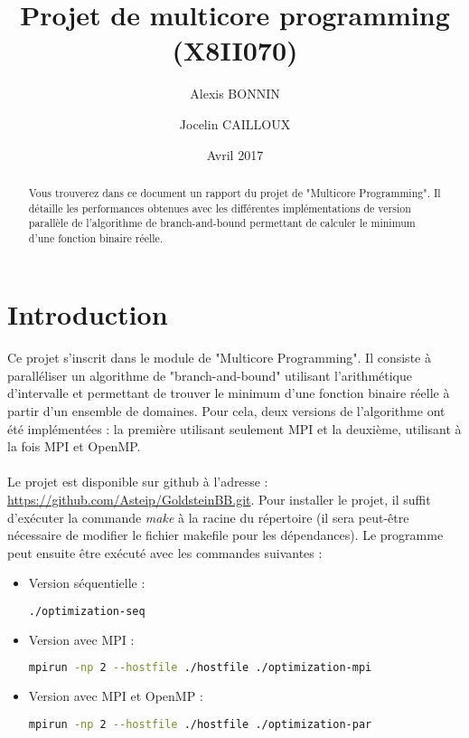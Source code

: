 \documentclass[11pt]{article}
\title{Projet de multicore programming (X8II070)}
\author{Alexis BONNIN \and Jocelin CAILLOUX}
\date{Avril 2017}
\begin{document}
\maketitle
\begin{abstract}
    Vous trouverez dans ce document un rapport du projet de "Multicore Programming". Il détaille les performances obtenues avec les différentes implémentations de version parallèle de l'algorithme de branch-and-bound permettant de calculer le minimum d'une fonction binaire réelle.
\end{abstract}
\tableofcontents
\newpage

\section{Introduction}
    
    \paragraph{}
    Ce projet s'inscrit dans le module de "Multicore Programming". Il consiste à paralléliser un algorithme de "branch-and-bound" utilisant l'arithmétique d'intervalle et permettant de trouver le minimum d'une fonction binaire réelle à partir d'un ensemble de domaines. Pour cela, deux versions de l'algorithme ont été implémentées : la première utilisant seulement MPI et la deuxième, utilisant à la fois MPI et OpenMP.
    
    \paragraph{}
    Le projet est disponible sur github à l'adresse : \url{https://github.com/Asteip/GoldsteinBB.git}. Pour installer le projet, il suffit d'exécuter la commande \textit{make} à la racine du répertoire (il sera peut-être nécessaire de modifier le fichier makefile pour les dépendances). Le programme peut ensuite être exécuté avec les commandes suivantes :
    
    \begin{itemize}
        \item Version séquentielle :
        \begin{lstlisting}[language=bash,captionpos=b]
        ./optimization-seq
        \end{lstlisting}
        
        \item Version avec MPI :
        \begin{lstlisting}[language=bash,captionpos=b]
        mpirun -np 2 --hostfile ./hostfile ./optimization-mpi
        \end{lstlisting}
        
        \item Version avec MPI et OpenMP :
        \begin{lstlisting}[language=bash,captionpos=b]
        mpirun -np 2 --hostfile ./hostfile ./optimization-par
        \end{lstlisting}
    \end{itemize}
\end{document}
